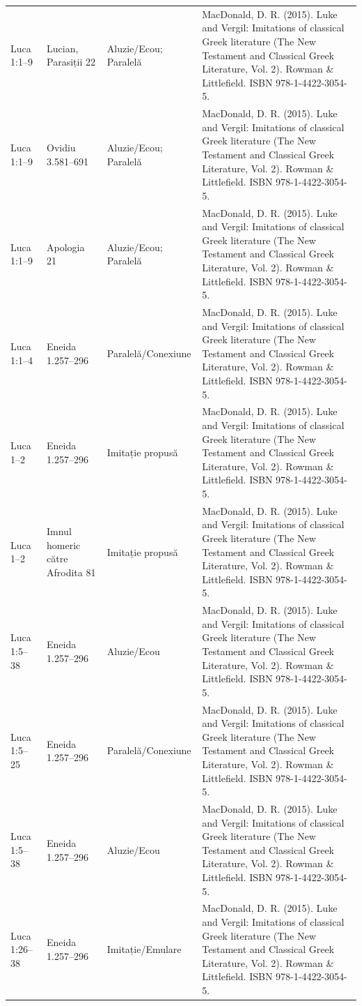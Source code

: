 \documentclass[12pt,a4paper,twoside,openany]{book}
\begin{document}
\begin{longtable}{L{1.4cm}L{1.7cm}L{3.1cm}L{8.4cm}}
Luca 1:1–9 & Lucian, Parasiții 22 & Aluzie/Ecou; Paralelă & MacDonald, D. R. (2015). Luke and Vergil: Imitations of classical Greek literature (The New Testament and Classical Greek Literature, Vol. 2). Rowman \& Littlefield. ISBN 978-1-4422-3054-5. \\
Luca 1:1–9 & Ovidiu 3.581–691 & Aluzie/Ecou; Paralelă & MacDonald, D. R. (2015). Luke and Vergil: Imitations of classical Greek literature (The New Testament and Classical Greek Literature, Vol. 2). Rowman \& Littlefield. ISBN 978-1-4422-3054-5. \\
Luca 1:1–9 & Apologia 21 & Aluzie/Ecou; Paralelă & MacDonald, D. R. (2015). Luke and Vergil: Imitations of classical Greek literature (The New Testament and Classical Greek Literature, Vol. 2). Rowman \& Littlefield. ISBN 978-1-4422-3054-5. \\
Luca 1:1–4 & Eneida 1.257–296 & Paralelă/Conexiune & MacDonald, D. R. (2015). Luke and Vergil: Imitations of classical Greek literature (The New Testament and Classical Greek Literature, Vol. 2). Rowman \& Littlefield. ISBN 978-1-4422-3054-5. \\
Luca 1–2 & Eneida 1.257–296 & Imitație propusă & MacDonald, D. R. (2015). Luke and Vergil: Imitations of classical Greek literature (The New Testament and Classical Greek Literature, Vol. 2). Rowman \& Littlefield. ISBN 978-1-4422-3054-5. \\
Luca 1–2 & Imnul homeric către Afrodita 81 & Imitație propusă & MacDonald, D. R. (2015). Luke and Vergil: Imitations of classical Greek literature (The New Testament and Classical Greek Literature, Vol. 2). Rowman \& Littlefield. ISBN 978-1-4422-3054-5. \\
Luca 1:5–38 & Eneida 1.257–296 & Aluzie/Ecou & MacDonald, D. R. (2015). Luke and Vergil: Imitations of classical Greek literature (The New Testament and Classical Greek Literature, Vol. 2). Rowman \& Littlefield. ISBN 978-1-4422-3054-5. \\
Luca 1:5–25 & Eneida 1.257–296 & Paralelă/Conexiune & MacDonald, D. R. (2015). Luke and Vergil: Imitations of classical Greek literature (The New Testament and Classical Greek Literature, Vol. 2). Rowman \& Littlefield. ISBN 978-1-4422-3054-5. \\
Luca 1:5–38 & Eneida 1.257–296 & Aluzie/Ecou & MacDonald, D. R. (2015). Luke and Vergil: Imitations of classical Greek literature (The New Testament and Classical Greek Literature, Vol. 2). Rowman \& Littlefield. ISBN 978-1-4422-3054-5. \\
Luca 1:26–38 & Eneida 1.257–296 & Imitație/Emulare & MacDonald, D. R. (2015). Luke and Vergil: Imitations of classical Greek literature (The New Testament and Classical Greek Literature, Vol. 2). Rowman \& Littlefield. ISBN 978-1-4422-3054-5. \\

\end{longtable}
\end{document}
